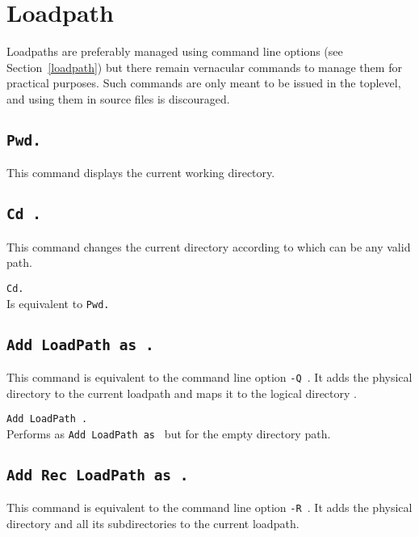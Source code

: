 \section[Loadpath]{Loadpath}

Loadpaths are preferably managed using {\Coq} command line options
(see Section~\ref{loadpath}) but there remain vernacular commands to
manage them for practical purposes. Such commands are only meant to be issued in
the toplevel, and using them in source files is discouraged.

\subsection[\tt Pwd.]{\tt Pwd.\label{Pwd}}
This command displays the current working directory.

\subsection[\tt Cd {\str}.]{\tt Cd {\str}.}
This command changes the current directory according to {\str}
which can be any valid path.

\begin{Variants}
\item {\tt Cd.}\\
  Is equivalent to {\tt Pwd.}
\end{Variants}

\subsection[\tt Add LoadPath {\str} as {\dirpath}.]{\tt Add LoadPath {\str} as {\dirpath}.\label{AddLoadPath}}

This command is equivalent to the command line option {\tt -Q {\str}
  {\dirpath}}. It adds the physical directory {\str} to the current {\Coq}
loadpath and maps it to the logical directory {\dirpath}.

\begin{Variants}
\item {\tt Add LoadPath {\str}.}\\
Performs as {\tt Add LoadPath {\str} as {\dirpath}} but for the empty directory path.
\end{Variants}

\subsection[\tt Add Rec LoadPath {\str} as {\dirpath}.]{\tt Add Rec LoadPath {\str} as {\dirpath}.\label{AddRecLoadPath}}
This command is equivalent to the command line option {\tt -R {\str}
  {\dirpath}}. It adds the physical directory {\str} and all its
subdirectories to the current {\Coq} loadpath.

